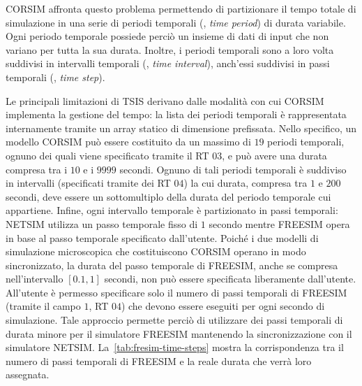 \acs{CORSIM} affronta questo problema permettendo di partizionare il tempo totale di simulazione in una serie di periodi temporali (\ie{}, \emph{time period}) di durata variabile. Ogni periodo temporale possiede perciò un insieme di dati di input che non variano per tutta la sua durata. Inoltre, i periodi temporali sono a loro volta suddivisi in intervalli temporali (\ie{}, \emph{time interval}), anch'essi suddivisi in passi temporali (\ie{}, \emph{time step}).

Le principali limitazioni di \acs{TSIS} derivano dalle modalità con cui \acs{CORSIM} implementa la gestione del tempo: la lista dei periodi temporali è rappresentata internamente tramite un array statico di dimensione prefissata. Nello specifico, un modello \acs{CORSIM} può essere costituito da un massimo di $19$ periodi temporali, ognuno dei quali viene specificato tramite il \acs{RT} $03$, e può avere una durata compresa tra i $10$ e i $9999$ secondi. Ognuno di tali periodi temporali è suddiviso in intervalli (specificati tramite dei \acs{RT} $04$) la cui durata, compresa tra $1$ e $200$ secondi, deve essere un sottomultiplo della durata del periodo temporale cui appartiene. Infine, ogni intervallo temporale è partizionato in passi temporali: \acs{NETSIM} utilizza un passo temporale fisso di $1$ secondo mentre \acs{FREESIM} opera in base al passo temporale specificato dall'utente. Poiché i due modelli di simulazione microscopica che costituiscono \acs{CORSIM} operano in modo sincronizzato, la durata del passo temporale di \acs{FREESIM}, anche se compresa nell'intervallo $[0.1,1]$ secondi, non può essere specificata liberamente dall'utente. All'utente è permesso specificare solo il numero di passi temporali di \acs{FREESIM} (tramite il campo $1$, \acs{RT} $04$) che devono essere eseguiti per ogni secondo di simulazione. Tale approccio permette perciò di utilizzare dei passi temporali di durata minore per il simulatore \acs{FREESIM} mantenendo la sincronizzazione con il simulatore \acs{NETSIM}. La~\vref{tab:fresim-time-steps} mostra la corrispondenza tra il numero di passi temporali di \acs{FREESIM} e la reale durata che verrà loro assegnata.

